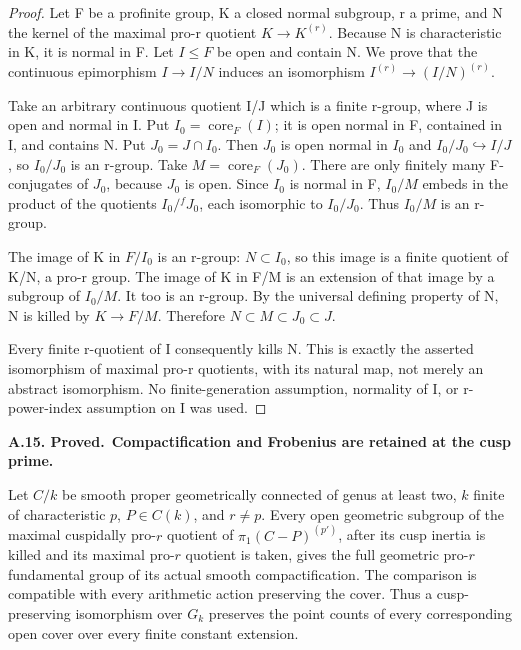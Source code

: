 \documentclass[11pt,a4paper]{article}
\newenvironment{claim}[3]{\par\medskip\noindent\hypertarget{#1}{\textbf{#1. #2.}}\ \textbf{#3.}\par\nopagebreak\smallskip\begingroup\itshape}{\endgroup\par\smallskip}
\begin{document}
\begin{proof}

Let F be a profinite group, K a closed normal subgroup, r a prime, and N the kernel of the maximal pro-r quotient \(K{\to}K^{(r)}\). Because N is characteristic in K, it is normal in F. Let \(I{\le}F\) be open and contain N. We prove that the continuous epimorphism \(I{\to}I/N\) induces an isomorphism \(I^{(r)}\to(I/N)^{(r)}\).

Take an arbitrary continuous quotient I/J which is a finite r-group, where J is open and normal in I. Put \(I_0=\operatorname{core}_F(I)\); it is open normal in F, contained in I, and contains N. Put \(J_0=J{\cap}I_0\). Then \(J_0\) is open normal in \(I_0\) and \(I_0/J_0\hookrightarrow I/J\), so \(I_0/J_0\) is an r-group. Take \(M=\operatorname{core}_F(J_0)\). There are only finitely many F-conjugates of \(J_0\), because \(J_0\) is open. Since \(I_0\) is normal in F, \(I_0/M\) embeds in the product of the quotients \(I_0/{}^fJ_0\), each isomorphic to \(I_0/J_0\). Thus \(I_0/M\) is an r-group.

The image of K in \(F/I_0\) is an r-group: \(N{\subset}I_0\), so this image is a finite quotient of K/N, a pro-r group. The image of K in F/M is an extension of that image by a subgroup of \(I_0/M\). It too is an r-group. By the universal defining property of N, N is killed by \(K{\to}F/M\). Therefore \(N\subset M\subset J_0\subset J\).

Every finite r-quotient of I consequently kills N. This is exactly the asserted isomorphism of maximal pro-r quotients, with its natural map, not merely an abstract isomorphism. No finite-generation assumption, normality of I, or r-power-index assumption on I was used.


\end{proof}

\begin{claim}{A.15}{Proved}{Compactification and Frobenius are retained at the cusp prime}

Let $C/k$ be smooth proper geometrically connected of genus at least two,
$k$ finite of characteristic $p$, $P\in C(k)$, and $r\ne p$.
Every open geometric subgroup of the maximal cuspidally pro-$r$
quotient of $\pi_1(C-P)^{(p')}$, after its cusp inertia is killed and
its maximal pro-$r$ quotient is taken, gives the full geometric
pro-$r$ fundamental group of its actual smooth compactification.
The comparison is compatible with every arithmetic action preserving
the cover. Thus a cusp-preserving isomorphism over $G_k$ preserves
the point counts of every corresponding open cover over every
finite constant extension.

\end{claim}
\end{document}
